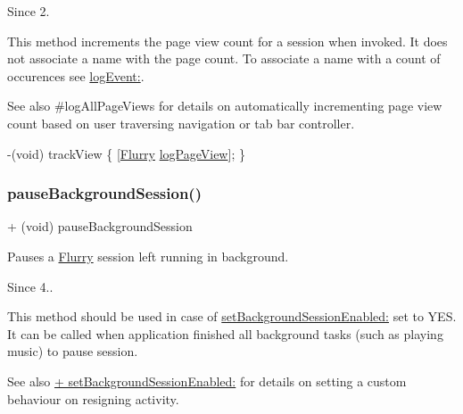 \begin{DoxySince}{Since}
2.
\end{DoxySince}
This method increments the page view count for a session when invoked. It does not associate a name with the page count. To associate a name with a count of occurences see \hyperlink{interfaceFlurry_a5433aaf247d3e14120ba05877d034a61}{log\+Event\+:}.

\begin{DoxySeeAlso}{See also}
\#log\+All\+Page\+Views for details on automatically incrementing page view count based on user traversing navigation or tab bar controller.
\end{DoxySeeAlso}

\begin{DoxyCode}
   -(void) trackView 
\{
[\hyperlink{interfaceFlurry}{Flurry} \hyperlink{interfaceFlurry_a612da8f1557fa0e29d50640400d896ec}{logPageView}];
\}
\end{DoxyCode}
 \mbox{\label{interfaceFlurry_a57e18dc7c992272e3dc89e7f3bc853f4}} 
\subsubsection{\texorpdfstring{pause\+Background\+Session()}{pauseBackgroundSession()}}
{\footnotesize\ttfamily + (void) pause\+Background\+Session \begin{DoxyParamCaption}{ }\end{DoxyParamCaption}}



Pauses a \hyperlink{interfaceFlurry}{Flurry} session left running in background. 

\begin{DoxySince}{Since}
4..
\end{DoxySince}
This method should be used in case of \hyperlink{interfaceFlurry_a936cba06051ba7a149b988a434d2a05c}{set\+Background\+Session\+Enabled\+:} set to Y\+ES. It can be called when application finished all background tasks (such as playing music) to pause session.

\begin{DoxySeeAlso}{See also}
\hyperlink{interfaceFlurry_a936cba06051ba7a149b988a434d2a05c}{+ set\+Background\+Session\+Enabled\+:} for details on setting a custom behaviour on resigning activity.
\end{DoxySeeAlso}

